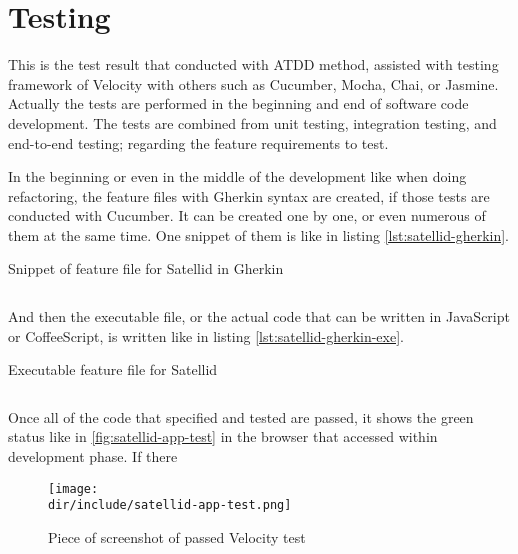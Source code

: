 \clearpage
\section{Testing}
\label{sec:testing}

This is the test result that conducted with \ac{ATDD} method, assisted with testing framework of Velocity with others such as Cucumber, Mocha, Chai, or Jasmine.
Actually the tests are performed in the beginning and end of software code development.
The tests are combined from unit testing, integration testing, and end-to-end testing; regarding the feature requirements to test.

In the beginning or even in the middle of the development like when doing refactoring, the feature files with Gherkin syntax are created, if those tests are conducted with Cucumber.
It can be created one by one, or even numerous of them at the same time.
One snippet of them is like in listing \autoref{lst:satellid-gherkin}.

\begin{listing}[!htb]
  \caption{Snippet of feature file for Satellid in Gherkin}
  \inputminted{ruby}{\dir/include/code/.snippets/satellid-gherkin.txt}
  \label{lst:satellid-gherkin}
\end{listing}

And then the executable file, or the actual code that can be written in JavaScript or CoffeeScript, is written like in listing \autoref{lst:satellid-gherkin-exe}.

\begin{listing}[ht]
  \caption{Executable feature file for Satellid}
  \inputminted{javascript}{\dir/include/code/.snippets/satellid-gherkin.js}
  \label{lst:satellid-gherkin-exe}
\end{listing}

Once all of the code that specified and tested are passed, it shows the green status like in \autoref{fig:satellid-app-test} in the browser that accessed within development phase.
If there

\begin{figure}[htb]
  \centering
  \texttt{[image: \\dir/include/satellid-app-test.png]}
  \caption{Piece of screenshot of passed Velocity test}
  \label{fig:satellid-app-test}
\end{figure}
